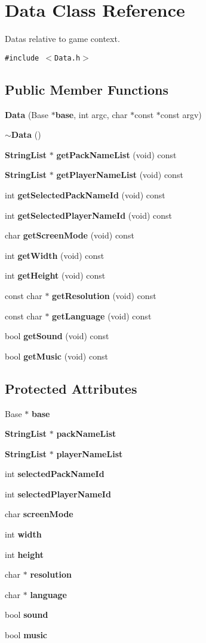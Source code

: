 \section{Data Class Reference}
\label{classData}
Datas relative to game context.  


{\tt \#include $<$Data.h$>$}

\subsection*{Public Member Functions}
\begin{CompactItemize}
\item 
{\bf Data} (Base $\ast${\bf base}, int argc, char $\ast$const $\ast$const argv)
\item 
{\bf $\sim$Data} ()
\item 
{\bf StringList} $\ast$ {\bf getPackNameList} (void) const 
\item 
{\bf StringList} $\ast$ {\bf getPlayerNameList} (void) const 
\item 
int {\bf getSelectedPackNameId} (void) const 
\item 
int {\bf getSelectedPlayerNameId} (void) const 
\item 
char {\bf getScreenMode} (void) const 
\item 
int {\bf getWidth} (void) const 
\item 
int {\bf getHeight} (void) const 
\item 
const char $\ast$ {\bf getResolution} (void) const 
\item 
const char $\ast$ {\bf getLanguage} (void) const 
\item 
bool {\bf getSound} (void) const 
\item 
bool {\bf getMusic} (void) const 
\end{CompactItemize}
\subsection*{Protected Attributes}
\begin{CompactItemize}
\item 
Base $\ast$ {\bf base}
\item 
{\bf StringList} $\ast$ {\bf packNameList}
\item 
{\bf StringList} $\ast$ {\bf playerNameList}
\item 
int {\bf selectedPackNameId}
\item 
int {\bf selectedPlayerNameId}
\item 
char {\bf screenMode}
\item 
int {\bf width}
\item 
int {\bf height}
\item 
char $\ast$ {\bf resolution}
\item 
char $\ast$ {\bf language}
\item 
bool {\bf sound}
\item 
bool {\bf music}
\end{CompactItemize}


